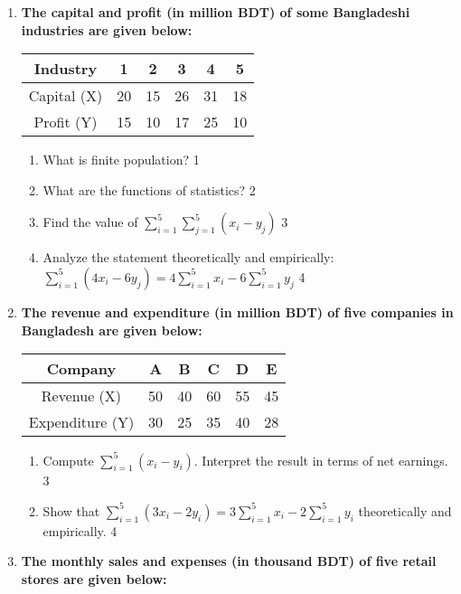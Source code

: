 \documentclass[a4paper,oneside]{book}
\begin{document}
\begin{enumerate}
   \item
	  \textbf{The capital and profit (in million BDT) of some Bangladeshi 
	  industries are given below:}
	  
	  \begin{table}[h]
	  \centering
\begin{tabular}{c|ccccc}
Industry & 1 & 2 & 3 & 4 & 5 \\ \hline
Capital (X) & 20 & 15 & 26 & 31 & 18 \\ \hline
Profit (Y) & 15 & 10 & 17 & 25 & 10
\end{tabular}
\end{table}
  
  \begin{enumerate}
    \item
	What is finite population? \hfill 1
    \item
	What are the functions of statistics? \hfill 2
    \item  
	Find the value of $\displaystyle \sum_{i=1}^5 \sum_{j=1}^5 (x_i - y_j)$ \hfill 3
    \item
	Analyze the statement theoretically and empirically:  $\displaystyle \sum_{i=1}^5 (4x_i-6y_j) = 4 \sum_{i=1}^5 x_i - 6 \sum_{i=1}^5 y_j $ \hfill 4
  \end{enumerate}
  
  \item  
	  \textbf{The revenue and expenditure (in million BDT) of five companies in Bangladesh are given below:}  
	  
	  \begin{table}[h]
	  \centering
\begin{tabular}{c|ccccc}
Company & A & B & C & D & E \\ \hline
Revenue (X) & 50 & 40 & 60 & 55 & 45 \\ \hline
Expenditure (Y) & 30 & 25 & 35 & 40 & 28
\end{tabular}
\end{table}
  
  \begin{enumerate}
    \item  
	Compute $\displaystyle \sum_{i=1}^5 (x_i - y_i)$. Interpret the result in terms of net earnings. \hfill 3  
    \item  
	Show that $\displaystyle \sum_{i=1}^5 (3x_i - 2y_i) = 3 \sum_{i=1}^5 x_i - 2 \sum_{i=1}^5 y_i$ theoretically and empirically. \hfill 4  
  \end{enumerate}  

  
  \item
\textbf{The monthly sales and expenses (in thousand BDT) of five retail stores are given below:}


\end{enumerate}
\end{document}
